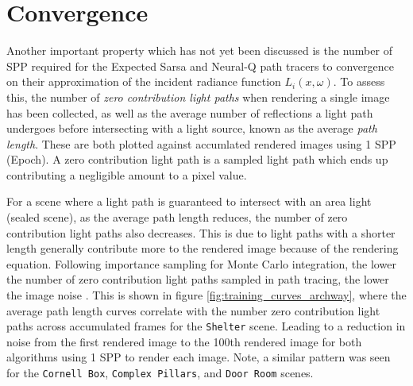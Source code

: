\documentclass[../dissertation.tex]{subfiles}
\begin{document}
\section{Convergence}
\label{sec:convergence_learning_incident}

Another important property which has not yet been discussed is the number of SPP required for the Expected Sarsa and Neural-Q path tracers to convergence on their approximation of the incident radiance function $L_i(x, \omega)$. To assess this, the number of \textit{zero contribution light paths} when rendering a single image has been collected, as well as the average number of reflections a light path undergoes before intersecting with a light source, known as the average \textit{path length}. These are both plotted against accumlated rendered images using 1 SPP (Epoch). A zero contribution light path is a sampled light path which ends up contributing a negligible amount to a pixel value.

For a scene where a light path is guaranteed to intersect with an area light (sealed scene), as the average path length reduces, the number of zero contribution light paths also decreases. This is due to light paths with a shorter length generally contribute more to the rendered image because of the rendering equation. Following importance sampling for Monte Carlo integration, the lower the number of zero contribution light paths sampled in path tracing, the lower the image noise \cite{dahm2017learning}.  This is shown in figure \ref{fig:training_curves_archway}, where the average path length curves correlate with the number zero contribution light paths across accumulated frames for the \verb|Shelter| scene. Leading to a reduction in noise from the first rendered image to the 100th rendered image for both algorithms using 1 SPP to render each image. Note, a similar pattern was seen for the     \verb|Cornell Box|, \verb|Complex Pillars|, and \verb|Door Room| scenes.
\end{document}
